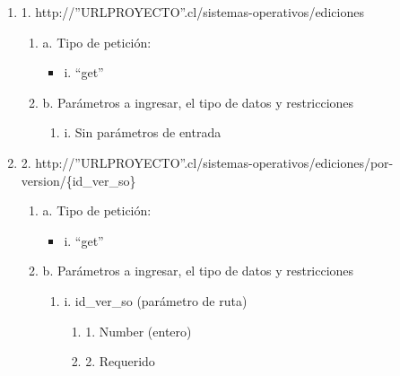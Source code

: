 \begin{enumerate}
    \item 1. http://”URLPROYECTO”.cl/sistemas-operativos/ediciones
    \begin{enumerate}
        \item a. Tipo de petición:
            \begin{itemize}
               \item i. “get”
            \end{itemize}
        \item b. Parámetros a ingresar, el tipo de datos y restricciones
            \begin{enumerate}
                \item i. Sin parámetros de entrada
            \end{enumerate}
    \end{enumerate}

    \item 2. http://”URLPROYECTO”.cl/sistemas-operativos/ediciones/por-version/\{id\_ver\_so\}
    \begin{enumerate}
        \item a. Tipo de petición:
            \begin{itemize}
               \item i. “get”
            \end{itemize}
        \item b. Parámetros a ingresar, el tipo de datos y restricciones
            \begin{enumerate}
                \item i. id\_ver\_so (parámetro de ruta)
                    \begin{enumerate}
                        \item 1. Number (entero)
                        \item 2. Requerido
                    \end{enumerate}
            \end{enumerate}
    \end{enumerate}


\end{enumerate}
